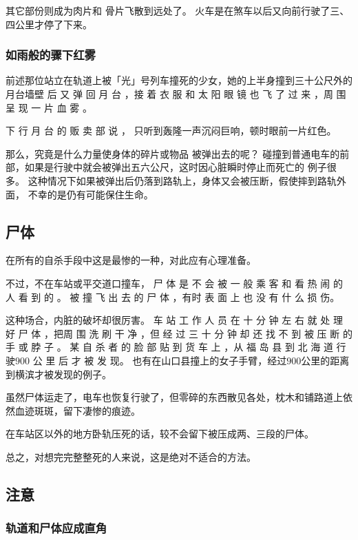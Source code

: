 \documentclass[UTF8]{ctexart}
\begin{document}
其它部份则成为肉片和 骨片飞散到远处了。
火车是在煞车以后又向前行驶了三、四公里才停了下来。 

\subsubsection*{如雨般的骤下红雾}

前述那位站立在轨道上被「光」号列车撞死的少女，她的上半身撞到三十公尺外的月台墙壁 后 又 弹 回 月 台 ，接 着 衣 服 和 太 阳 眼 镜 也 飞 了 过 来 ，周 围 呈 现 一 片 血 雾 。

下 行 月 台 的 贩 卖 部 说 ， 只听到轰隆一声沉闷巨响，顿时眼前一片红色。

那么，究竟是什么力量使身体的碎片或物品 被弹出去的呢？ 碰撞到普通电车的前部，如果是行驶中就会被弹出五六公尺，这时因心脏瞬时停止而死亡的 例子很多。
这种情况下如果被弹出后仍落到路轨上，身体又会被压断，假使摔到路轨外面， 不幸的是仍有可能保住生命。

\subsection{尸体}

在所有的自杀手段中这是最惨的一种，对此应有心理准备。

不过，不在车站或平交道口撞车， 尸 体 是 不 会 被 一 般 乘 客 和 看 热 闹 的 人 看 到 的 。
被 撞 飞 出 去 的 尸 体 ，有时 表 面 上 也 没 有 什 么 损 伤。

这种场合，内脏的破坏却很厉害。 
车 站 工 作 人 员 在 十 分 钟 左 右 就 处 理 好 尸 体 ，把周 围 洗 刷 干 净 ，但 经 过 三 十 分 钟 却 还 找 不 到 被 压 断 的 手 或 脖 子 。
某 自 杀 者 的 脸 部 贴 到 货 车 上 ，从 福 岛 县 到 北 海 道 行 驶$900$ 公 里 后 才 被 发 现。
也有在山口县撞上的女子手臂，经过$900$公里的距离到横滨才被发现的例子。 

虽然尸体运走了，电车也恢复行驶了，但零碎的东西散见各处，枕木和铺路道上依然血迹斑斑，留下凄惨的痕迹。

在车站区以外的地方卧轨压死的话，较不会留下被压成两、三段的尸体。

总之，对想完完整整死的人来说，这是绝对不适合的方法。

\subsection{注意}

\subsubsection*{轨道和尸体应成直角}
\end{document}
